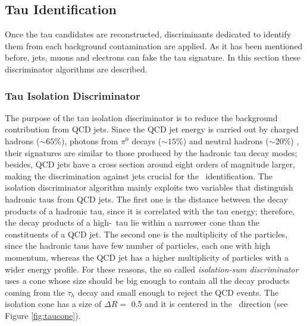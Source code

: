 
\subsection{Tau Identification}
\label{subsec:TauIdentification}

\noindent Once the tau candidates are reconstructed, discriminants dedicated
to identify them from each background contamination are applied. As it has 
been mentioned before, jets, muons and electrons can fake the 
tau signature. In this section these discriminator algorithms
are described. 

\subsubsection{Tau Isolation Discriminator}
\label{subsubsec:IsoDiscriminators}

The purpose of the tau isolation discriminator is to reduce the background contribution
from QCD jets. Since the QCD jet energy is carried out by charged hadrons ($\sim65\%$), photons 
from $\pi^{0}$ decays ($\sim15\%$) and neutral hadrons ($\sim20\%$) \cite{CMS-PAS-PFT-10-001},
their signatures are similar to those produced by the hadronic tau decay modes; besides, QCD 
jets have a cross section around eight orders of magnitude larger, making the discrimination
against jets crucial for the \tauh~identification. The isolation discriminator
algorithm mainly exploits two variables that distinguish hadronic taus from 
QCD jets. The first one is the distance between the decay products of a hadronic tau, since 
it is correlated with the tau energy; therefore, the decay products of 
a high-\pt~tau lie within a narrower cone than the constituents of a QCD jet. The 
second one is the multiplicity of the particles, since the hadronic 
taus have few number of particles, each one with high momentum, whereas 
the QCD jet has a higher multiplicity of particles with 
a wider energy profile. For these reasons, the so 
called \textit{isolation-sum discriminator} uses a cone whose size 
should be big enough to contain all the decay products coming 
from the $\tau_{h}$ decay and small enough to reject the QCD events. The 
isolation cone has a size of $\Delta R =$ 0.5 and it 
is centered in the \tauh~direction (see Figure \ref{fig:taucone}). \\

